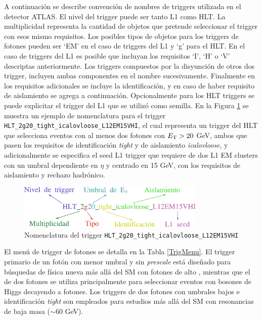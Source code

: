 A continuación se describe convención de nombres de triggers utilizada en el detector ATLAS.
El nivel del trigger puede ser tanto L1 como HLT. La multiplicidad representa la cantidad de objetos que pretende seleccionar el trigger con esos mismo requisitos. Los posibles tipos de objetos para los triggers de fotones pueden ser `EM' en el caso de triggers del L1 y `g' para el HLT. En el caso de triggers del L1 es posible que incluyan los requisitos `I', `H' o `V' descriptas anteriormente. Los triggers compuestos por la disyunción de otros dos trigger, incluyen ambas componentes en el nombre sucesivamente. Finalmente en los requisitos adicionales se incluye la identificación, y en caso de haber requisito de aislamiento se agrega a continuación. Opcionalmente para los HLT triggers se puede explicitar el trigger del L1 que se utilizó como semilla. En la Figura \ref{fig:trigger_name} se muestra un ejemplo de nomenclatura para el trigger \texttt{HLT\_2g20\_tight\_icalovloose\_L12EM15VHI}, el cual representa un trigger del HLT que selecciona eventos con al menos dos fotones con $E_{\text{T}}>20$ GeV, ambos que pasen los requisitos de identificación \textit{tight} y de aislamiento \textit{icalovloose}, y adicionalmente se especifica el seed L1 trigger que requiere de dos L1 EM clusters con un umbral dependiente en $\eta$ y centrado en 15 GeV, con los requisitos de aislamiento y rechazo hadrónico.

\begin{figure}
  \centering
  \includegraphics[width=0.8\textwidth]{images/trigger/trigger_name.pdf}
  \caption{Nomenclatura del trigger \texttt{HLT\_2g20\_tight\_icalovloose\_L12EM15VHI}}
  \label{fig:trigger_name}
\end{figure}

El menú de trigger de fotones se detalla en la Tabla \ref{TrigMenu}. El trigger primario de un fotón con menor umbral y sin \textit{prescale} está diseñado para búsquedas de física nueva más allá del SM con fotones de alto \ET, mientras que el de dos fotones se utiliza principalmente para seleccionar eventos con bosones de Higgs decayendo a fotones. Los triggers de dos fotones con umbrales bajos e identificación \textit{tight} son empleados para estudios más allá del SM con resonancias de baja masa ($\sim60$ GeV).



